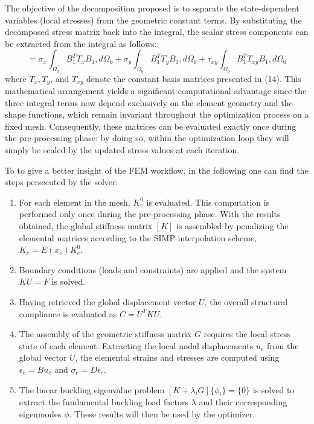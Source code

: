 \documentclass{article}
\begin{document}
The objective of the decomposition proposed is to separate the state-dependent variables (local stresses) from the geometric constant terms. By substituting the decomposed stress matrix back into the integral, the scalar stress components can be extracted from the integral as follows:
\begin{equation}
[G_e^0] = \sigma_x \int_{\Omega_0} B_1^T T_x B_1, d\Omega_0 + \sigma_y \int_{\Omega_0} B_1^T T_y B_1, d\Omega_0 + \tau_{xy} \int_{\Omega_0} B_1^T T_{xy} B_1, d\Omega_0
\end{equation}
\noindent where $T_x, T_y$, and $T_{xy}$ denote the constant basis matrices presented in (14). This mathematical arrangement yields a significant computational advantage since the three integral terms now depend exclusively on the element geometry and the shape functions, which remain invariant throughout the optimization process on a fixed mesh. Consequently, these matrices can be evaluated exactly once during the pre-processing phase: by doing so, within the optimization loop they will simply be scaled by the updated stress values at each iteration.

\vspace{\baselineskip}
To to give a better insight of the FEM workflow, in the following one can find the steps persecuted by the solver:
\begin{enumerate}
    \item For each element in the mesh, $K_e^0$ is evaluated. This computation is performed only once during the pre-processing phase. With the results obtained, the global stiffness matrix $[K]$ is assembled by penalizing the elemental matrices according to the SIMP interpolation scheme, $K_e = E(x_e)K_e^0$.
    \item Boundary conditions (loads and constraints) are applied and the system $KU = F$ is solved.
    \item Having retrieved the global displacement vector $U$, the overall structural compliance is evaluated as $C = U^T K U$.
    \item The assembly of the geometric stiffness matrix $G$ requires the local stress state of each element. Extracting the local nodal displacements $u_e$ from the global vector $U$, the elemental strains and stresses are computed using $\epsilon_e = B u_e$ and $\sigma_e = D \epsilon_e$.
    \item The linear buckling eigenvalue problem $[K + \lambda_i G]\{\phi_i\} = \{0\}$ is solved to extract the fundamental buckling load factors $\lambda$ and their corresponding eigenmodes $\phi$. These results will then be used by the optimizer.
\end{enumerate}
\end{document}
